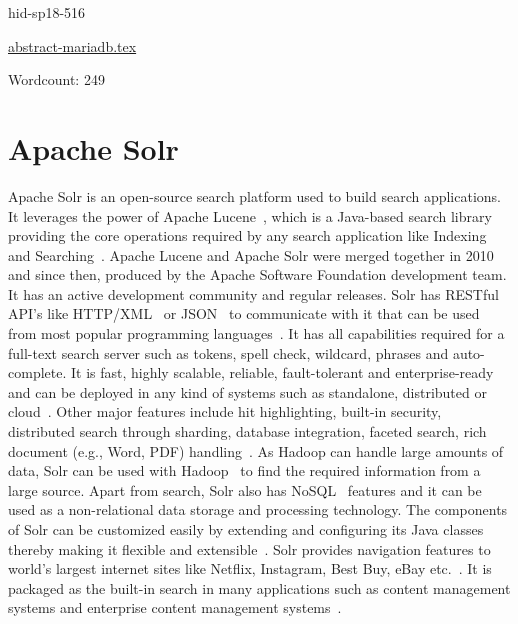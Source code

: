 \begin{IU}

hid-sp18-516

\href{https://github.com/cloudmesh-community/hid-sp18-516/blob/master//technology/abstract-mariadb.tex}{abstract-mariadb.tex}

 

Wordcount: 249

\end{IU}

\section{Apache Solr}

Apache Solr is an open-source search platform used
to build search applications. It leverages the power of Apache
Lucene~\cite{hid-sp18-516-www-wiki-lucene}, which is a Java-based 
search library providing the core operations required by any search 
application like Indexing and 
Searching~\cite{hid-sp18-516-www-tutorialspoint-solr}. Apache Lucene and Apache
Solr were merged together in 2010 and since then, produced by the Apache
Software Foundation development team. It has an active development community 
and regular releases. Solr has RESTful API's like 
HTTP/XML~\cite{hid-sp18-516-www-wiki-xml} or 
JSON~\cite{hid-sp18-516-www-wiki-json} to communicate with it that can be used 
from most popular programming languages~\cite{hid-sp18-516-www-wiki-solr}. 
It has all capabilities required for a full-text search server such as tokens, 
spell check, wildcard, phrases and auto-complete. It is fast, highly scalable, 
reliable, fault-tolerant and enterprise-ready and can be deployed in any kind 
of systems such as standalone, distributed or 
cloud~\cite{hid-sp18-516-www-tutorialspoint-solr}. Other major features include 
hit highlighting, built-in security, distributed search through sharding, 
database integration, faceted search, rich document (e.g., Word, PDF)
handling~\cite{hid-sp18-516-www-wiki-solr}. As Hadoop can handle large amounts
of data, Solr can be used with Hadoop~\cite{hid-sp18-516-www-wiki-hadoop} to 
find the required information from a large source. Apart from search, Solr also 
has NoSQL~\cite{hid-sp18-516-www-wiki-nosql} features and it can be used
as a non-relational data storage and processing technology. The components of
Solr can be customized easily by extending and configuring its Java classes
thereby making it flexible and 
extensible~\cite{hid-sp18-516-www-tutorialspoint-solr}. Solr provides navigation
features to world's largest internet sites like Netflix, Instagram, Best Buy,
eBay etc.~\cite{hid-sp18-516-www-apacheorg-solr}. It is packaged as the built-in
search in many applications such as content management systems and enterprise
content management systems~\cite{hid-sp18-516-www-wiki-solr}.


